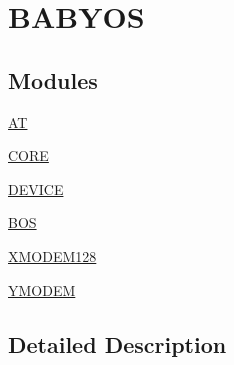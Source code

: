 \hypertarget{group___b_a_b_y_o_s}{}\section{B\+A\+B\+Y\+OS}
\label{group___b_a_b_y_o_s}
\subsection*{Modules}
\begin{DoxyCompactItemize}
\item 
\mbox{\hyperlink{group___a_t}{AT}}
\item 
\mbox{\hyperlink{group___c_o_r_e}{C\+O\+RE}}
\item 
\mbox{\hyperlink{group___d_e_v_i_c_e}{D\+E\+V\+I\+CE}}
\item 
\mbox{\hyperlink{group___b_o_s}{B\+OS}}
\item 
\mbox{\hyperlink{group___x_m_o_d_e_m128}{X\+M\+O\+D\+E\+M128}}
\item 
\mbox{\hyperlink{group___y_m_o_d_e_m}{Y\+M\+O\+D\+EM}}
\end{DoxyCompactItemize}


\subsection{Detailed Description}
